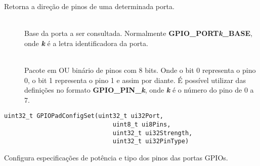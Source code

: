 Retorna a direção de pinos de uma determinada porta.

\begin{description}
	\item []\hfill \\
	Base da porta a ser consultada. Normalmente \textbf{GPIO\_PORT\emph{k}\_BASE}, onde \textbf{\emph{k}} é a letra identificadora da porta.
	
	\item []\hfill \\
	Pacote em OU binário de pinos com 8 bits. Onde o bit 0 representa o pino 0, o bit 1 representa o pino 1 e assim por diante. É possível utilizar das definições no formato  \textbf{GPIO\_PIN\_\emph{k}}, onde \textbf{\emph{k}} é o número do pino de 0 a 7.
\end{description}

\begin{lstlisting}[style=funcao]
	uint32_t GPIOPadConfigSet(uint32_t ui32Port,
							  uint8_t ui8Pins,
							  uint32_t ui32Strength,
							  uint32_t ui32PinType)
\end{lstlisting}

Configura especificações de potência e tipo dos pinos das portas GPIOs.

